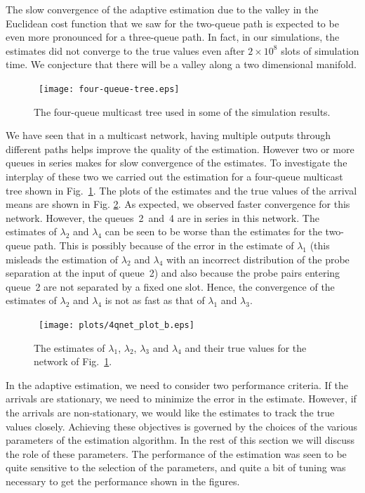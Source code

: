 \documentclass[11pt]{article}
\begin{document}
The slow convergence of the adaptive estimation due to the valley in
the Euclidean cost function that we saw for the two-queue path is
expected to be even more pronounced for a three-queue path. In fact,
in our simulations, the estimates did not converge to the true values
even after $2 \times 10^8$ slots of simulation time.  We conjecture
that there will be a valley along a two dimensional manifold.

\begin{figure}
  \begin{center}
    \ 
    \texttt{[image: four-queue-tree.eps]}
  \end{center}
  \caption{The four-queue multicast tree used in some of the
    simulation results. }
  \label{fig:four-queue-tree}
\end{figure}


We have seen that in a multicast network, having multiple outputs
through different paths helps improve the quality of the estimation.
However two or more queues in series makes for slow convergence of the
estimates. To investigate the interplay of these two we carried out
the estimation for a four-queue multicast tree shown in
Fig.~\ref{fig:four-queue-tree}.  The plots of the estimates and the
true values of the arrival means are shown in Fig.  \ref{fig_4qnet}.
As expected, we observed faster convergence for this network. However,
the queues~2~and~4 are in series in this network. The estimates of
$\lambda_2$ and $\lambda_4$ can be seen to be worse than the estimates
for the two-queue path.  This is possibly because of the error in the
estimate of $\lambda_1$ (this misleads the estimation of $\lambda_2$
and $\lambda_4$ with an incorrect distribution of the probe separation
at the input of queue~2) and also because the probe pairs entering
queue~2 are not separated by a fixed one slot. Hence, the convergence
of the estimates of $\lambda_2$ and $\lambda_4$ is not as fast as that
of $\lambda_1$ and $\lambda_3$.
\begin{figure}
  \begin{center}
    \
    \texttt{[image: plots/4qnet\_plot\_b.eps]}
  \end{center}
  \caption{The estimates of $\lambda_1$, $\lambda_2$, $\lambda_3$ and
    $\lambda_4$ and their true values for the network of
    Fig.~\ref{fig:four-queue-tree}.}
  \label{fig_4qnet}
\end{figure}

In the adaptive estimation, we need to consider two performance
criteria. If the arrivals are stationary, we need to minimize the
error in the estimate. However, if the arrivals are non-stationary, we
would like the estimates to track the true values closely. Achieving
these objectives is governed by the choices of the various parameters
of the estimation algorithm.  In the rest of this section we will
discuss the role of these parameters. The performance of the estimation
was seen to be quite sensitive to the selection of the parameters,
and quite a bit of tuning was necessary to get the performance
shown in the figures.
\end{document}
